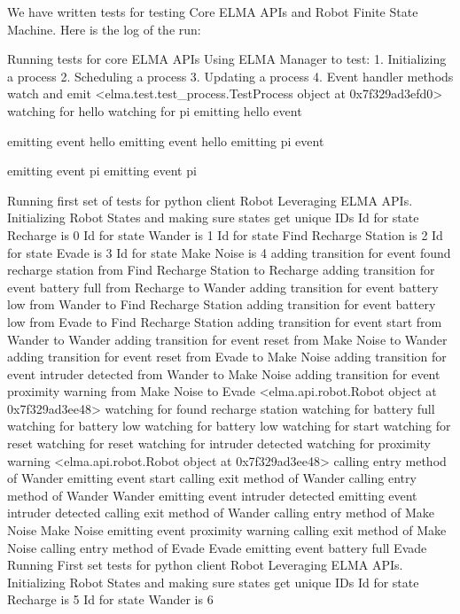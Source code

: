 \begin{DoxyEnumerate}
\item We have written tests for testing Core E\+L\+MA A\+P\+Is and Robot Finite State Machine. Here is the log of the run\+: 
\begin{DoxyCode}
Running tests for core ELMA APIs Using ELMA Manager to test: 1. Initializing a process 2. Scheduling a
       process  3. Updating a process 4. Event handler methods watch and emit
<elma.test.test\_process.TestProcess object at 0x7f329ad3efd0>
watching for hello
watching for pi
emitting hello event

emitting event hello
emitting event hello
emitting pi event

emitting event pi
emitting event pi

Running first set of tests for python client Robot Leveraging ELMA APIs.
Initializing Robot States and making sure states get unique IDs
Id for state Recharge is 0
Id for state Wander is 1
Id for state Find Recharge Station is 2
Id for state Evade is 3
Id for state Make Noise is 4
adding transition for event found recharge station from Find Recharge Station to Recharge
adding transition for event battery full from Recharge to Wander
adding transition for event battery low from Wander to Find Recharge Station
adding transition for event battery low from Evade to Find Recharge Station
adding transition for event start from Wander to Wander
adding transition for event reset from Make Noise to Wander
adding transition for event reset from Evade to Make Noise
adding transition for event intruder detected from Wander to Make Noise
adding transition for event proximity warning from Make Noise to Evade
<elma.api.robot.Robot object at 0x7f329ad3ee48>
watching for found recharge station
watching for battery full
watching for battery low
watching for battery low
watching for start
watching for reset
watching for reset
watching for intruder detected
watching for proximity warning
<elma.api.robot.Robot object at 0x7f329ad3ee48>
calling entry method of Wander
emitting event start
calling exit method of Wander
calling entry method of Wander
Wander
emitting event intruder detected
emitting event intruder detected
calling exit method of Wander
calling entry method of Make Noise
Make Noise
emitting event proximity warning
calling exit method of Make Noise
calling entry method of Evade
Evade
emitting event battery full
Evade
Running First set tests for python client Robot Leveraging ELMA APIs.
Initializing Robot States and making sure states get unique IDs
Id for state Recharge is 5
Id for state Wander is 6

\end{DoxyCode}
\end{DoxyEnumerate}
